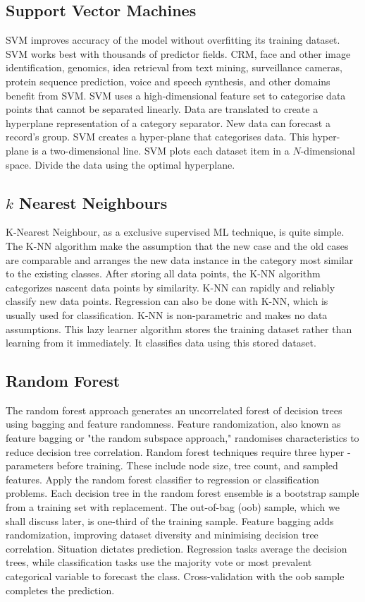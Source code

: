 \documentclass[conference]{IEEEtran}
\begin{document}
\subsection{Support Vector Machines}
SVM improves accuracy of the model without overfitting its training dataset. SVM works best with thousands of predictor fields. CRM, face and other image identification, genomics, idea retrieval from text mining, surveillance cameras, protein sequence prediction, voice and speech synthesis, and other domains benefit from SVM. SVM uses a high-dimensional feature set to categorise data points that cannot be separated linearly. Data are translated to create a hyperplane representation of a category separator. New data can forecast a record's group. SVM creates a hyper-plane that categorises data. This hyper-plane is a two-dimensional line. SVM plots each dataset item in a $N$-dimensional space. Divide the data using the optimal hyperplane.
\subsection{$k$ Nearest Neighbours}
K-Nearest Neighbour, as a exclusive supervised ML technique, is quite simple. The K-NN algorithm make the assumption that the new case and the old cases are comparable and arranges the new data instance in the category most similar to the existing classes. After storing all data points, the K-NN algorithm categorizes nascent data points by similarity. K-NN can rapidly and reliably classify new data points. Regression can also be done with K-NN, which is usually used for classification. K-NN is non-parametric and makes no data assumptions. This lazy learner algorithm stores the training dataset rather than learning from it immediately. It classifies data using this stored dataset.
\subsection{Random Forest}
The random forest approach generates an uncorrelated forest of decision trees using bagging and feature randomness. Feature randomization, also known as feature bagging or "the random subspace approach," randomises characteristics to reduce decision tree correlation. Random forest techniques require three hyper - parameters before training. These include node size, tree count, and sampled features. Apply the random forest classifier to regression or classification problems. Each decision tree in the random forest ensemble is a bootstrap sample from a training set with replacement. The out-of-bag (oob) sample, which we shall discuss later, is one-third of the training sample. Feature bagging adds randomization, improving dataset diversity and minimising decision tree correlation. Situation dictates prediction. Regression tasks average the decision trees, while classification tasks use the majority vote or most prevalent categorical variable to forecast the class. Cross-validation with the oob sample completes the prediction.
\end{document}

